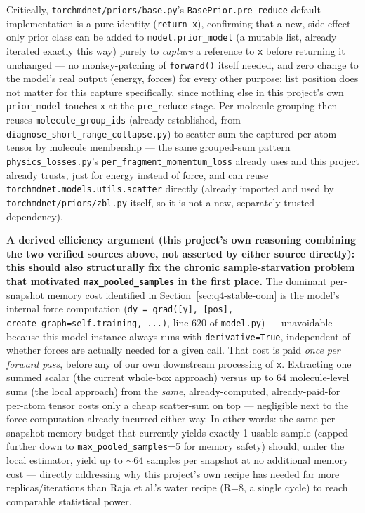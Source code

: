 \documentclass[11pt]{article}
\begin{document}
Critically, \texttt{torchmdnet/priors/base.py}'s \texttt{BasePrior.pre\_reduce}
default implementation is a pure identity (\texttt{return x}), confirming
that a new, side-effect-only prior class can be added to
\texttt{model.prior\_model} (a mutable list, already iterated exactly this
way) purely to \emph{capture} a reference to \texttt{x} before returning it
unchanged --- no monkey-patching of \texttt{forward()} itself needed, and
zero change to the model's real output (energy, forces) for every other
purpose; list position does not matter for this capture specifically,
since nothing else in this project's own \texttt{prior\_model} touches
\texttt{x} at the \texttt{pre\_reduce} stage. Per-molecule grouping then
reuses \texttt{molecule\_group\_ids}
(already established, from \texttt{diagnose\_short\_range\_collapse.py})
to scatter-sum the captured per-atom tensor by molecule membership --- the
same grouped-sum pattern \texttt{physics\_losses.py}'s
\texttt{per\_fragment\_momentum\_loss} already uses and this project
already trusts, just for energy instead of force, and can reuse
\texttt{torchmdnet.models.utils.scatter} directly (already imported and
used by \texttt{torchmdnet/priors/zbl.py} itself, so it is not a new,
separately-trusted dependency).

\textbf{A derived efficiency argument (this project's own reasoning
combining the two verified sources above, not asserted by either source
directly): this should also structurally fix the chronic
sample-starvation problem that motivated \texttt{max\_pooled\_samples} in
the first place.} The dominant per-snapshot memory cost identified in
Section~\ref{sec:q4-stable-oom} is the model's internal force computation
(\texttt{dy = grad([y], [pos], create\_graph=self.training, ...)}, line 620
of \texttt{model.py}) --- unavoidable because this model instance always
runs with \texttt{derivative=True}, independent of whether forces are
actually needed for a given call. That cost is paid \emph{once per
forward pass}, before any of our own downstream processing of \texttt{x}.
Extracting one summed scalar (the current whole-box approach) versus up to
64 molecule-level sums (the local approach) from the \emph{same},
already-computed, already-paid-for per-atom tensor costs only a cheap
scatter-sum on top --- negligible next to the force computation already
incurred either way. In other words: the same per-snapshot memory budget
that currently yields exactly 1 usable sample (capped further down to
\texttt{max\_pooled\_samples}=5 for memory safety) should, under the local
estimator, yield up to $\sim$64 samples per snapshot at no additional
memory cost --- directly addressing why this project's own recipe has
needed far more replicas/iterations than Raja et al.'s water recipe
(R=8, a single cycle) to reach comparable statistical power.
\end{document}
